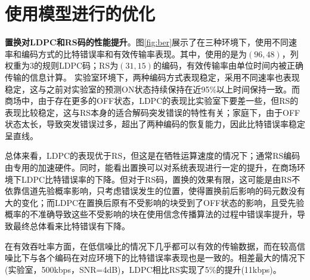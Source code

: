 \section{使用模型进行的优化}

\textbf{置换对LDPC和RS码的性能提升}。图\ref{fig:ber}展示了在三种环境下，使用不同速率和编码方式的比特错误率和有效传输率表现。其中，使用的是为$(96,48)$，列权重为$3$的规则LDPC码；RS为$(31,15)$的编码，有效传输率由单位时间内被正确传输的信息计算。
实验室环境下，两种编码方式表现稳定，采用不同速率也表现稳定，这与之前对实验室的预测ON状态持续保持在近95\%以上时间保持一致。而商场中，由于存在更多的OFF状态，LDPC的表现比实验室下要差一些，但RS的表现比较稳定，这与RS本身的适合解码突发错误的特性有关；家庭下，由于OFF状态太长，导致突发错误过多，超出了两种编码的恢复能力，因此比特错误率稳定呈直线。

总体来看，LDPC的表现优于RS，但这是在牺牲运算速度的情况下；通常RS编码由专用的加速硬件。同时，能看出置换可以对系统表现进行一定的提升，在商场环境下LDPC比特错误率的下降。但对于RS码，置换的效果有限，这可能是由RS不依靠信道先验概率影响，只考虑错误发生的位置，使得置换前后影响的码元数没有大的变化；而LDPC在置换后原有不受影响的块受到了OFF状态的影响，且受先验概率的不准确导致这些不受影响的块在使用信念传播算法的过程中错误率提升，导致最终总体看来比特错误有下降。

在有效吞吐率方面，在低信噪比的情况下几乎都可以有效的传输数据，而在较高信噪比下与各个编码在对应环境下的比特错误率表现也是一致的。相差最大的情况下(实验室，500kbps，SNR=4dB)，LDPC相比RS实现了5\%的提升(11kbps)。

